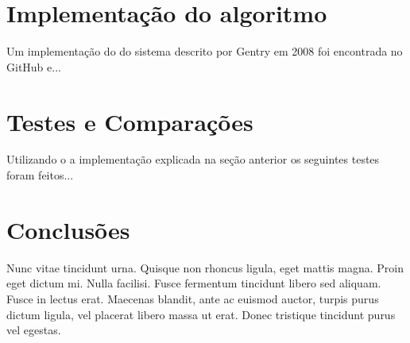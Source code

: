 \section{Implementação do algoritmo}\label{sec:LABEL_CHP_1_SEC_F}
Um implementação do do sistema descrito por Gentry em 2008 foi encontrada no GitHub e...


\section{Testes e Comparações}\label{sec:LABEL_CHP_1_SEC_G}
Utilizando o a implementação explicada na seção anterior os seguintes testes foram feitos...


\section{Conclusões}\label{sec:LABEL_CHP_1_SEC_J}
Nunc vitae tincidunt urna. Quisque non rhoncus ligula, eget mattis magna. Proin eget dictum mi. Nulla facilisi. Fusce fermentum tincidunt libero sed aliquam. Fusce in lectus erat. Maecenas blandit, ante ac euismod auctor, turpis purus dictum ligula, vel placerat libero massa ut erat. Donec tristique tincidunt purus vel egestas.